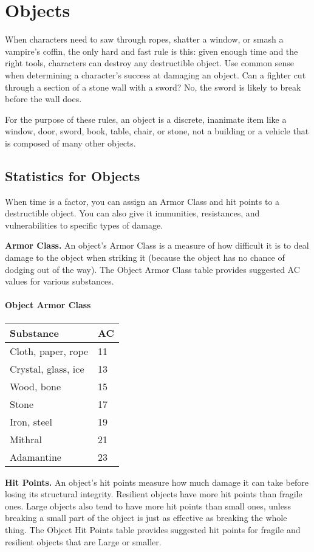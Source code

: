 \documentclass[
]{article}
\date{}
\begin{document}
\hypertarget{objects}{%
\section{Objects}\label{objects}}

When characters need to saw through ropes, shatter a window, or smash a
vampire's coffin, the only hard and fast rule is this: given enough time
and the right tools, characters can destroy any destructible object. Use
common sense when determining a character's success at damaging an
object. Can a fighter cut through a section of a stone wall with a
sword? No, the sword is likely to break before the wall does.

For the purpose of these rules, an object is a discrete, inanimate item
like a window, door, sword, book, table, chair, or stone, not a building
or a vehicle that is composed of many other objects.

\hypertarget{statistics-for-objects}{%
\subsection{Statistics for Objects}\label{statistics-for-objects}}

When time is a factor, you can assign an Armor Class and hit points to a
destructible object. You can also give it immunities, resistances, and
vulnerabilities to specific types of damage.

\textbf{Armor Class.} An object's Armor Class is a measure of how
difficult it is to deal damage to the object when striking it (because
the object has no chance of dodging out of the way). The Object Armor
Class table provides suggested AC values for various substances.

\hypertarget{object-armor-class}{%
\paragraph{Object Armor Class}\label{object-armor-class}}

\begin{longtable}[]{@{}ll@{}}
\toprule
Substance & AC\tabularnewline
\midrule
\endhead
Cloth, paper, rope & 11\tabularnewline
Crystal, glass, ice & 13\tabularnewline
Wood, bone & 15\tabularnewline
Stone & 17\tabularnewline
Iron, steel & 19\tabularnewline
Mithral & 21\tabularnewline
Adamantine & 23\tabularnewline
\bottomrule
\end{longtable}

\textbf{Hit Points.} An object's hit points measure how much damage it
can take before losing its structural integrity. Resilient objects have
more hit points than fragile ones. Large objects also tend to have more
hit points than small ones, unless breaking a small part of the object
is just as effective as breaking the whole thing. The Object Hit Points
table provides suggested hit points for fragile and resilient objects
that are Large or smaller.
\end{document}
